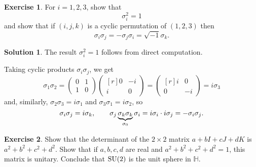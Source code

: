 \documentclass[11pt, a4paper]{report}
\theoremstyle{definition}
\newtheorem{ex}{Exercise}[part]
\newtheorem{sol}{Solution}[part]
\newcommand*{\SU}{\ensuremath\text{SU}}
\begin{document}
\begin{ex}

For $i = 1, 2, 3$, show that
\[
    \sigma_i^2 = 1
\]
and show that if $(i, j, k)$ is a cyclic permutation of $(1, 2, 3)$ then
\[
    \sigma_i \sigma_j = -\sigma_j \sigma_i = \sqrt{-1} \sigma_k.
\]
\end{ex}

\begin{sol}

The result $\sigma_i^2 = 1$ follows from direct computation.

Taking cyclic products $\sigma_i \sigma_j$, we get
\[
    \sigma_1 \sigma_2
    =
    \begin{pmatrix}
        0 & 1 \\
        1 & 0
    \end{pmatrix}
    \begin{pmatrix*}[r]
        0 & -i \\
        i &  0
    \end{pmatrix*}
    =
    \begin{pmatrix*}[r]
        i &  0 \\
        0 & -i
    \end{pmatrix*}
    = i\sigma_3
\]
and, similarly, $\sigma_2 \sigma_3 = i\sigma_1$ and $\sigma_3 \sigma_1 = i \sigma_2$, so
\[
    \sigma_i \sigma_j = i\sigma_k, \qquad
    \sigma_j \underbrace{\sigma_k \sigma_k}_{\sigma_0} \sigma_i
        = i \sigma_i \cdot i \sigma_j \\
        = -\sigma_i \sigma_j.
\]

\end{sol}

\begin{ex}

Show that the determinant of the $2 \times 2$ matrix $a + bI + cJ + dK$ is $a^2  + b^2 + c^2 + d^2$.
Show that if $a, b, c, d$ are real and $a^2 + b^2 + c^2 + d^2 = 1$, this matrix is unitary.
Conclude that $\SU(2)$ is the unit sphere in $\mathbb{H}$.

\end{ex}
\end{document}
